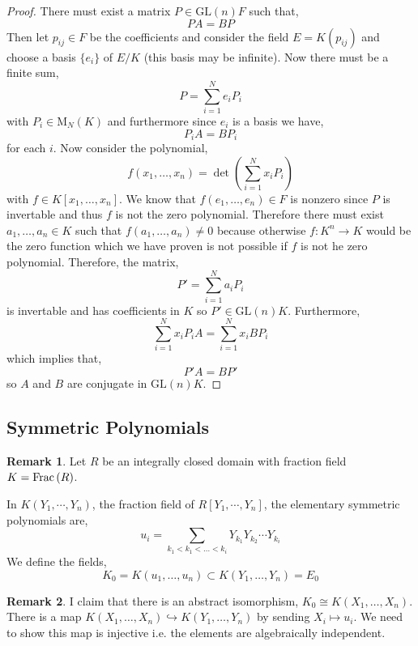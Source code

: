 \documentclass[12pt]{extarticle}
\theoremstyle{definition}
\newtheorem{remark}{Remark}
\newenvironment{definition}[1][Definition:]{\begin{trivlist}
\item[\hskip \labelsep {\bfseries #1}]}{\end{trivlist}}
\newcommand{\GL}[1]{\mathrm{GL}\left(#1\right)}
\newcommand{\embed}{\hookrightarrow}
\begin{document}
\begin{proof}
There must exist a matrix $P \in \GL{n}{F}$ such that,
\[ PA = BP \]
Then let $p_{ij} \in F$ be the coefficients and consider the field $E = K(p_{ij})$ and choose a basis $\{ e_i \}$ of $E / K$ (this basis may be infinite). Now there must be a finite sum,
\[ P = \sum_{i = 1}^N e_i P_i \]
with $P_i \in \mathrm{M}_N(K)$ and furthermore since $e_i$ is a basis we have,
\[ P_i A = B P_i \]
for each $i$. Now consider the polynomial,
\[ f(x_1, \dots, x_n) = \det{\left( \sum_{i = 1}^N x_i P_i \right)} \]
with $f \in K[x_1, \dots, x_n]$. We know that $f(e_1, \dots, e_n) \in F$ is nonzero since $P$ is invertable and thus $f$ is not the zero polynomial. Therefore there must exist $a_1, \dots, a_n \in K$ such that $f(a_1, \dots, a_n) \neq 0$ because otherwise $f : K^n \to K$ would be the zero function which we have proven is not possible if $f$ is not he zero polynomial. Therefore, the matrix,
\[ P' = \sum_{i = 1}^N a_i P_i \]
is invertable and has coefficients in $K$ so $P' \in \GL{n}{K}$. Furthermore,
\[ \sum_{i = 1}^N x_i P_i A = \sum_{i = 1}^N x_i B P_i \]
which implies that,
\[ P' A = B P' \]
so $A$ and $B$ are conjugate in $\GL{n}{K}$.  
\end{proof}

\subsection{Symmetric Polynomials}

\newcommand{\galgroup}[1]{\mathrm{Gal}\left( #1 \right)}
\newcommand{\Disc}[1]{\mathrm{Disc}\left( #1 \right)}

\begin{remark}
Let $R$ be an integrally closed domain with fraction field $K = \mathrm{Frac}\left( R \right)$.
\end{remark}

\begin{definition}
In $K(Y_1, \cdots, Y_n)$, the fraction field of $R[Y_1, \cdots, Y_n]$, the elementary symmetric polynomials are, 
\[ u_i = \sum_{k_1 < k_1 < \dots < k_i} Y_{k_1} Y_{k_2} \cdots Y_{k_i} \]
We define the fields,
\[ K_0 = K(u_1, \dots, u_n) \subset K(Y_1, \dots, Y_n) = E_0 \]
\end{definition}

\begin{remark}
I claim that there is an abstract isomorphism, $K_0 \cong K(X_1, \dots, X_n)$. There is a map $K(X_1, \dots, X_n) \embed K(Y_1, \dots, Y_n)$ by sending $X_i \mapsto u_i$. We need to show this map is injective i.e. the elements are algebraically independent. 
\end{remark}
\end{document}
